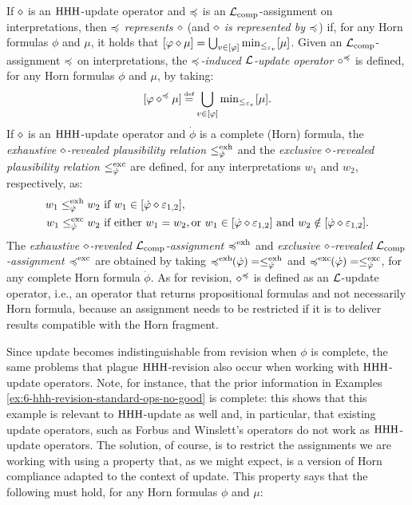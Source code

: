 If $\diamond$ is an ${\mathrm{HHH}}$-update operator and 
$\preccurlyeq$ is an $\mathcal{L}_{{\operatorname{comp}}}$-assignment on interpretations,
then \emph{$\preccurlyeq$ represents $\diamond$}
(and \emph{$\diamond$ is represented by $\preccurlyeq$})
if, for any Horn formulas $\phi$ and $\mu$,
it holds that $[\varphi\diamond\mu] = \bigcup_{v\in[\varphi]}{\operatorname{min}}_{\le_{\varepsilon_{v}}}[\mu]$. 
Given an $\mathcal{L}_{{\operatorname{comp}}}$-assignment $\preccurlyeq$ on interpretations, 
the \emph{$\preccurlyeq$-induced $\mathcal{L}$-update operator $\circ^\preccurlyeq$} is defined,
for any Horn formulas $\phi$ and $\mu$, 
by taking:
$$
	[\phi\up^\as\mu]\defeq\bigcup_{v\in[\phi]}\min_{\le_{\px_{v}}}[\mu].
$$
If $\diamond$ is an ${\mathrm{HHH}}$-update operator and $\dot{\phi}$ is a complete (Horn) formula,
the \emph{exhaustive $\diamond$-revealed plausibility relation $\le^{\operatorname{exh}}_{\dot{\varphi}}$} 
and the \emph{exclusive $\diamond$-revealed plausibility relation $\le^{\operatorname{exc}}_{\dot{\varphi}}$} 
are defined, for any interpretations $w_1$ and $w_2$, respectively, as:
\begin{align*}
	w_1\le^{\operatorname{exh}}_{\dot{\varphi}} w_2 &~\text{if}~w_1\in[{\dot{\varphi}}\diamond\varepsilon_{1,2}],\\
	w_1\le^{\operatorname{exc}}_{\dot{\varphi}} w_2 &~\text{if either}~w_1=w_2,
			\text{or}~w_1\in[{\dot{\varphi}}\diamond\varepsilon_{1,2}]~\text{and}~w_2\notin[{\dot{\varphi}}\diamond\varepsilon_{1,2}].
\end{align*}
The \emph{exhaustive $\diamond$-revealed $\mathcal{L}_{{\operatorname{comp}}}$-assignment $\preccurlyeq^{\operatorname{exh}}$} 
and \emph{exclusive $\diamond$-revealed $\mathcal{L}_{{\operatorname{comp}}}$-assignment $\preccurlyeq^{\operatorname{exc}}$} 
are obtained by taking $\preccurlyeq^{\operatorname{exh}}\!\!(\dot{\varphi})=\le^{\operatorname{exh}}_{\dot{\varphi}}$ 
and $\preccurlyeq^{\operatorname{exc}}\!\!(\dot{\varphi})=\le^{\operatorname{exc}}_{\dot{\varphi}}$, for any complete 
Horn formula $\dot{\phi}$.
As for revision,
$\diamond^{\preccurlyeq}$ is defined as an $\mathcal{L}$-update operator,
i.e., an operator that returns propositional formulas and
not necessarily Horn formula,
because an assignment needs to be restricted if it is to deliver 
results compatible with the Horn fragment.

Since update becomes indistinguishable from revision when $\phi$
is complete, the same problems that plague ${\mathrm{HHH}}$-revision also occur 
when working with ${\mathrm{HHH}}$-update operators.
Note, for instance, that the prior information in 
Examples \ref{ex:6-hhh-revision-standard-ops-no-good} is complete:
this shows that this example is relevant to ${\mathrm{HHH}}$-update as well 
and, in particular, that existing update operators, such as Forbus and Winslett's
operators do not work as ${\mathrm{HHH}}$-update operators.
The solution, of course, is to restrict the assignments we are working with 
using a property that, 
as we might expect, is a version of Horn compliance adapted to the context 
of update.
This property says that the following must hold,
for any Horn formulas $\phi$ and $\mu$:

